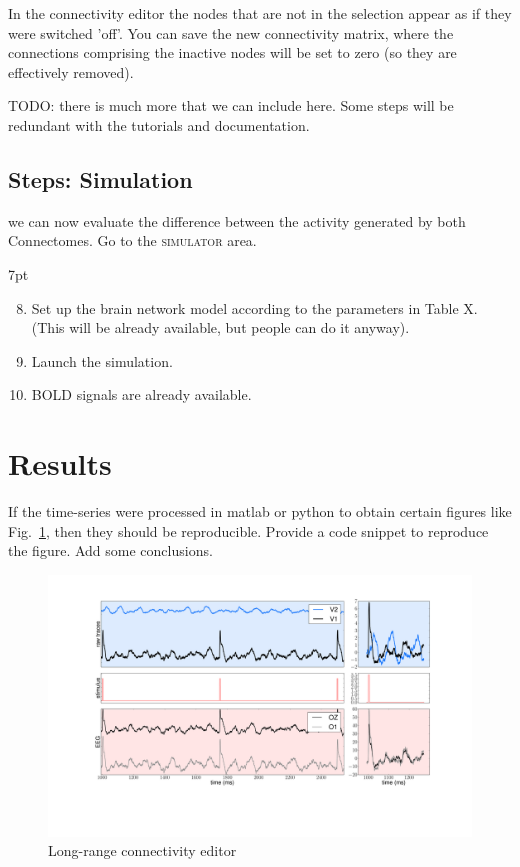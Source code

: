 \documentclass{tufte-handout}
\newenvironment{formal}{%
  \def\FrameCommand{%
    \hspace{1pt}%
    {\color{DarkBlue}\vrule width 2pt}%
    {\color{formalshade}\vrule width 4pt}%
    \colorbox{formalshade}%
  }%
  \MakeFramed{\advance\hsize-\width\FrameRestore}%
  \noindent\hspace{-4.55pt}%
  \begin{adjustwidth}{}{7pt}%
  \vspace{2pt}\vspace{2pt}%
}
{%
  \vspace{2pt}\end{adjustwidth}\endMakeFramed%
}
\begin{document}
\noindent In the connectivity editor the nodes that are not in the selection appear as if they were switched 'off'. 
You can save the new connectivity matrix, where the connections comprising the inactive nodes will be set to zero (so they are effectively removed). 

TODO: there is much more that we can include here. Some steps will be redundant with the tutorials and documentation.


\subsection{Steps: Simulation}

\noindent we can now evaluate the difference between the activity generated by both Connectomes. 
Go to the \textsc{simulator} area.

\begin{formal}
  \begin{enumerate}
  \setcounter{enumi}{7}
  \item Set up the brain network model according to the parameters in Table X. (This will be already available, but people can do it anyway).
  \item Launch the simulation.
  \item BOLD signals are already available.
  \end{enumerate}
\end{formal}

\section{Results}\label{sec:results}
If the time-series were processed in matlab or python to obtain certain
figures like Fig.~\ref{fig:fig_results}, then they should be reproducible.
Provide a code snippet to reproduce the figure. Add some conclusions.

\begin{figure}[h]
  \includegraphics[width=\linewidth]{results_Example_ER_stochastic.pdf}%
  \caption{Long-range connectivity editor}%
  \label{fig:fig_results}%
\end{figure}
\end{document}
